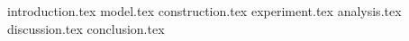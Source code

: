 {introduction.tex}
{model.tex}
{construction.tex}
{experiment.tex}
{analysis.tex}
{discussion.tex}
{conclusion.tex}
